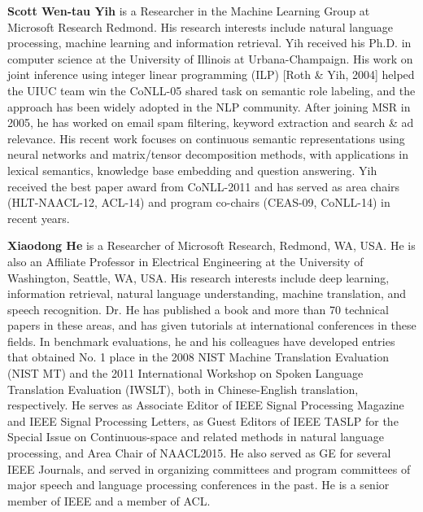 \begin{bio}
  {\bfseries Scott Wen-tau Yih} is a Researcher in the Machine
  Learning Group at Microsoft Research Redmond. His research interests
  include natural language processing, machine learning and
  information retrieval. Yih received his Ph.D. in computer science at
  the University of Illinois at Urbana-Champaign. His work on joint
  inference using integer linear programming (ILP) [Roth \& Yih, 2004]
  helped the UIUC team win the CoNLL-05 shared task on semantic role
  labeling, and the approach has been widely adopted in the NLP
  community. After joining MSR in 2005, he has worked on email spam
  filtering, keyword extraction and search \& ad relevance. His recent
  work focuses on continuous semantic representations using neural
  networks and matrix/tensor decomposition methods, with applications
  in lexical semantics, knowledge base embedding and question
  answering. Yih received the best paper award from CoNLL-2011 and has
  served as area chairs (HLT-NAACL-12, ACL-14) and program co-chairs
  (CEAS-09, CoNLL-14) in recent years.

  {\bfseries Xiaodong He} is a Researcher of Microsoft Research,
  Redmond, WA, USA. He is also an Affiliate Professor in Electrical
  Engineering at the University of Washington, Seattle, WA, USA. His
  research interests include deep learning, information retrieval,
  natural language understanding, machine translation, and speech
  recognition. Dr. He has published a book and more than 70 technical
  papers in these areas, and has given tutorials at international
  conferences in these fields. In benchmark evaluations, he and his
  colleagues have developed entries that obtained No. 1 place in the
  2008 NIST Machine Translation Evaluation (NIST MT) and the 2011
  International Workshop on Spoken Language Translation Evaluation
  (IWSLT), both in Chinese-English translation, respectively. He
  serves as Associate Editor of IEEE Signal Processing Magazine and
  IEEE Signal Processing Letters, as Guest Editors of IEEE TASLP for
  the Special Issue on Continuous-space and related methods in natural
  language processing, and Area Chair of NAACL2015. He also served as
  GE for several IEEE Journals, and served in organizing committees
  and program committees of major speech and language processing
  conferences in the past. He is a senior member of IEEE and a member
  of ACL. 


\end{bio}
